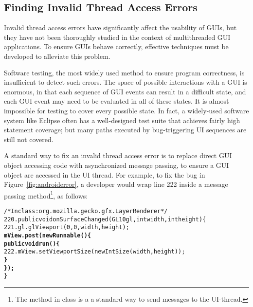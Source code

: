 


\subsection{Finding Invalid Thread Access Errors}
\label{sec:finding}

Invalid thread access errors have significantly affect the
usability of GUIs, but they have not been thoroughly studied in
the context of multithreaded GUI applications. To ensure GUIs
behave correctly, effective techniques must be developed to alleviate this problem.

Software testing, the most widely used method to ensure program correctness,
is insufficient to detect such errors. The space of possible interactions
with a GUI is enormous, in that each sequence of GUI events can result in
a difficult state, and each GUI event may need to be evaluated in all of
these states. It is almost impossible for testing to cover every possible
state. In fact, a widely-used software system like Eclipse
often has a well-designed test suite that achieves fairly high statement coverage;
but many paths executed by bug-triggering UI sequences are still not covered.

A standard way to fix an
invalid thread access error is to replace direct GUI object accessing code 
with asynchronized message passing, to ensure a GUI object are accessed in
the UI thread. For example, to fix the bug in Figure~\ref{fig:androiderror},
a developer would wrap line 222 inside a  message passing method\footnote{The
 method in class  is a
a standard way to send messages to the UI-thread.}, as follows:


\begin{CodeOut}
\begin{alltt}
     /* In class: org.mozilla.gecko.gfx.LayerRenderer */
220. public void onSurfaceChanged(GL10 gl, int width, int height) \{
221.     gl.glViewport(0, 0, width, height);
         \textbf{mView.post(new Runnable() \{}
             \textbf{public void run() \{}
222.             mView.setViewportSize(new IntSize(width, height));
             \textbf{\}}
         \textbf{\});}
     \}
\end{alltt}
\end{CodeOut}

